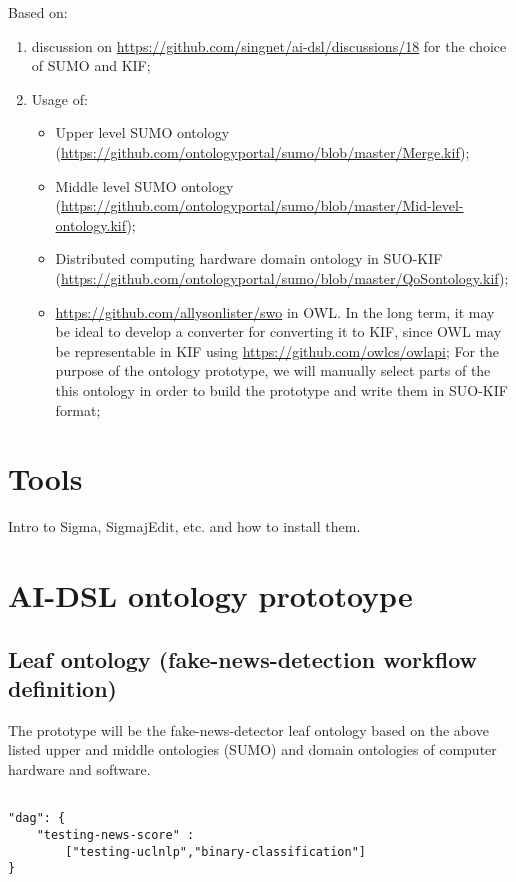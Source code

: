 \documentclass[]{report}
\begin{document}
Based on:
\begin{enumerate}
	\item discussion on \href{reusing existing ontologies}{https://github.com/singnet/ai-dsl/discussions/18} for the choice of SUMO and KIF;
	\item Usage of:
	\begin{itemize}
		\item Upper level SUMO ontology (\href{Merge.kif}{https://github.com/ontologyportal/sumo/blob/master/Merge.kif});
		\item Middle level SUMO ontology (\href{Mid-level-ontology.kif}{https://github.com/ontologyportal/sumo/blob/master/Mid-level-ontology.kif});
		\item Distributed computing hardware domain ontology in SUO-KIF (\href{QoSontology.kif}{https://github.com/ontologyportal/sumo/blob/master/QoSontology.kif});
		\item \href{Software ontology}{https://github.com/allysonlister/swo} in OWL. In the long term, it may be ideal to develop a converter for converting it to KIF, since OWL may be representable in KIF \cite{martin_translations_nodate} using \href{OWL API}{https://github.com/owlcs/owlapi}; For the purpose of the ontology prototype, we will manually select parts of the this ontology in order to build the prototype and write them in SUO-KIF format;
	\end{itemize}
\end{enumerate}

\section{Tools}

Intro to Sigma, SigmajEdit, etc. and how to install them.

\section{AI-DSL ontology prototoype}

\subsection{Leaf ontology (fake-news-detection workflow definition)}


The prototype will be the fake-news-detector leaf ontology based on the above listed upper and middle ontologies (SUMO) and domain ontologies of computer hardware and software.

\begin{lstlisting}[caption={\label{lst:dag}Program graph as \href{https://gitlab.com/nunet/fake-news-detection/fake\_news\_score/-/blob/master/service/dag.json}{defined and used in fake-news-warning app prototype} a the time of writing.},captionpos=b]

"dag": {
	"testing-news-score" : 
		["testing-uclnlp","binary-classification"]
}
\end{lstlisting}
\end{document}
